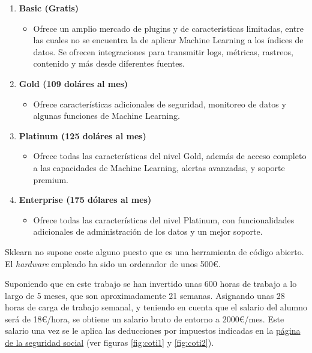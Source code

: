 \begin{enumerate}
    \item \textbf{Basic (Gratis)}
\begin{itemize}
        \item Ofrece un amplio mercado de plugins y de características limitadas, entre las cuales no se encuentra la de aplicar Machine Learning a los índices de datos. Se ofrecen integraciones para transmitir logs, métricas, rastreos, contenido y más desde diferentes fuentes. 
    \end{itemize}
    \item \textbf{Gold (109 doláres al mes)}
    \begin{itemize}
        \item Ofrece características adicionales de seguridad, monitoreo de datos y algunas funciones de Machine Learning.
    \end{itemize}
    \item \textbf{Platinum (125 doláres al mes)}
    \begin{itemize}
        \item Ofrece todas las características del nivel Gold, además de acceso completo a las capacidades de Machine Learning, alertas avanzadas, y soporte premium.
    \end{itemize}
    \item \textbf{Enterprise (175 dólares al mes)}
    \begin{itemize}
        \item Ofrece todas las características del nivel Platinum, con funcionalidades adicionales de administración de los datos y un mejor soporte.
    \end{itemize}
\end{enumerate}

Sklearn no supone coste alguno puesto que es una herramienta de código abierto. El \textit{hardware} empleado ha sido un ordenador de unos 500€.

Suponiendo que en este trabajo se han invertido unas 600 horas de trabajo a lo largo de 5 meses, que son aproximadamente 21 semanas. Asignando unas 28 horas de carga de trabajo semanal, y teniendo en cuenta que el salario del alumno será de 18€/hora, se obtiene un salario bruto de entorno a 2000€/mes. Este salario una vez se le aplica las deducciones por impuestos indicadas en la \href{https://www.seg-social.es/wps/portal/wss/internet/Trabajadores/CotizacionRecaudacionTrabajadores/36537}{página de la seguridad social} (ver figuras \ref{fig:coti1} y \ref{fig:coti2}).

